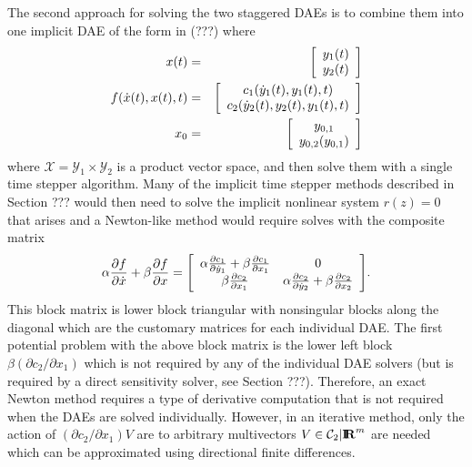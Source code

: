 \documentclass[pdf,ps2pdf,11pt]{SANDreport}
\begin{document}
The second approach for solving the two staggered DAEs is to combine them into
one implicit DAE of the form in (???) where
%
\begin{eqnarray*}
x(t) & = & {\bmat{c} y_1(t) \\ y_2(t) \emat} \\
f(\dot{x}(t),x(t),t) & = & {\bmat{c} c_1(\dot{y}_1(t),y_1(t),t) \\  c_2(\dot{y}_2(t),y_2(t),y_1(t),t) \emat} \\
x_0 & = & {\bmat{c} y_{0,1} \\ y_{0,2}(y_{0,1}) \emat}
\end{eqnarray*}
%
where $\mathcal{X}=\mathcal{Y}_1\times\mathcal{Y}_2$ is a product vector
space, and then solve them with a single time stepper algorithm.  Many of the
implicit time stepper methods described in Section ??? would then need to
solve the implicit nonlinear system $r(z)=0$ that arises and a Newton-like
method would require solves with the composite matrix
%
\begin{equation}
\alpha \frac{\partial f}{\partial \dot{x}} + \beta \frac{\partial f}{\partial x}
=
{\bmat{cc}
\alpha \frac{\partial c_1}{\partial \dot{y}_1} + \beta \frac{\partial c_1}{\partial x_1}
& 0 \\
\beta \frac{\partial c_2}{\partial x_1}
& \alpha \frac{\partial c_2}{\partial \dot{y}_2} + \beta \frac{\partial c_2}{\partial x_2} \\
\emat}.
\end{equation}
%
This block matrix is lower block triangular with nonsingular blocks along the
diagonal which are the customary matrices for each individual DAE.  The first
potential problem with the above block matrix is the lower left block $\beta
({}\partial c_2 / {}\partial x_1)$ which is not required by any of the
individual DAE solvers (but is required by a direct sensitivity solver, see
Section ???).  Therefore, an exact Newton method requires a type of derivative
computation that is not required when the DAEs are solved individually.
However, in an iterative method, only the action of $({}\partial c_2 /
{}\partial x_1) V$ are to arbitrary multivectors $V\in\mathcal{C}_2|\RE^m$ are
needed which can be approximated using directional finite differences.
\end{document}
